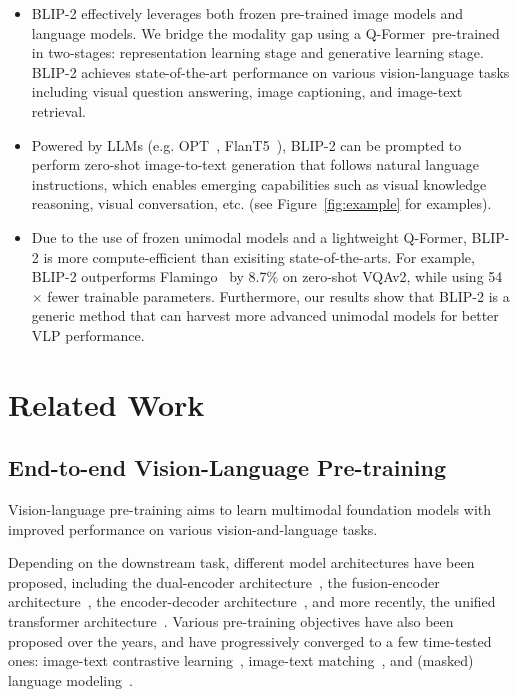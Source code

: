 \begin{itemize} [leftmargin=*]
    \item BLIP-2 effectively leverages both frozen pre-trained image models and language models. We bridge the modality gap using a Q-Former~pre-trained in two-stages: representation learning stage and generative learning stage. BLIP-2 achieves state-of-the-art performance on various vision-language tasks including visual question answering, image captioning, and image-text retrieval.
    \item
    Powered by LLMs (e.g. OPT~\cite{opt}, FlanT5~\cite{flanT5}), BLIP-2 can be prompted to perform zero-shot image-to-text generation that follows natural language instructions, which enables emerging capabilities such as visual knowledge reasoning, visual conversation, etc. (see Figure~\ref{fig:example} for examples).    
    \item
    Due to the use of frozen unimodal models and a lightweight Q-Former, BLIP-2 is more compute-efficient than exisiting state-of-the-arts. For example, BLIP-2 outperforms Flamingo~\cite{flamingo} by 8.7\% on zero-shot VQAv2, while using 54$\times$ fewer trainable parameters. Furthermore, our results show that BLIP-2 is a generic method that can harvest more advanced unimodal models for better VLP performance.

\end{itemize}

\section{Related Work}

\label{sec:related}

\subsection{End-to-end Vision-Language Pre-training}

Vision-language pre-training aims to learn multimodal foundation models with improved performance on various vision-and-language tasks.

Depending on the downstream task, different model architectures have been proposed, including the dual-encoder architecture~\cite{clip,align}, the fusion-encoder architecture~\cite{LXMERT,ALBEF}, the encoder-decoder architecture~\cite{VL_T5,simvlm,pali}, and more recently, the unified transformer architecture~\cite{blip,beit3}. Various pre-training objectives have also been proposed over the years, and have progressively converged to a few time-tested ones: image-text contrastive learning~\cite{clip,filip,ALBEF,blip}, image-text matching~\cite{ALBEF,blip,VLMo}, and (masked) language modeling~\cite{ALBEF,blip,coca,beit3}.

